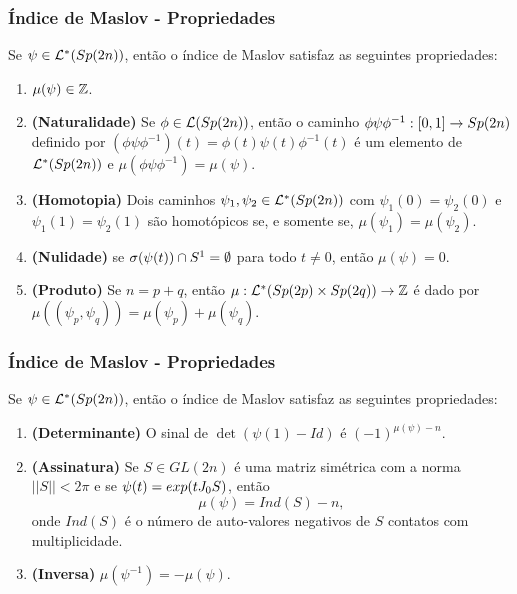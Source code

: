 \documentclass{beamer}
\begin{document}
	\begin{frame}			
		\frametitle{Índice de Maslov - Propriedades}
		\begin{teorema}
			Se $\psi \in \mathcal{L}^{*}(Sp(2n))$, então o índice de Maslov satisfaz as seguintes propriedades:
			\begin{enumerate}
				\item $\mu(\psi) \in \mathbb{Z}$.
				
				\item \textbf{(Naturalidade)}\label{item_naturalidade_maslov} Se $\phi\in \mathcal{L}(Sp(2n))$, então o caminho $\phi\psi\phi^{-1}: [0,1] \to Sp(2n)$ definido por $(\phi\psi\phi^{-1})(t) = \phi(t)\psi(t)\phi^{-1}(t)$ é um elemento de $\mathcal{L}^{*}(Sp(2n))$ e $\mu(\phi\psi\phi^{-1}) = \mu(\psi)$.
				
				\item \textbf{(Homotopia)} \label{item_homotopia_caminhos_teorema_indice_maslov} Dois caminhos $\psi_{1}, \psi_{2}\in \mathcal{L}^{*}(Sp(2n)) $ com $\psi_{1}(0) = \psi_{2}(0)$ e $\psi_{1}(1) = \psi_{2}(1)$ são homotópicos se, e somente se, $\mu(\psi_{1}) = \mu(\psi_{2})$.
				
				\item \textbf{(Nulidade)} se $\sigma(\psi(t))\cap S^{1} = \emptyset$ para todo $t\neq 0$, então $\mu(\psi) = 0$.
				
					\item \textbf{(Produto)} Se $n=p+q$, então  $\mu:\mathcal{L}^{*}(Sp(2p)\times Sp(2q)) \to \mathbb{Z}$ é dado por $\mu((\psi_{p}, \psi_{q})) = \mu(\psi_{p})+\mu(\psi_{q})$.
			\end{enumerate}
		\end{teorema}
	\end{frame}
	
	\begin{frame}
		\frametitle{Índice de Maslov - Propriedades}
			\begin{teorema}\label{teorema_indice_maslov}
				Se $\psi \in \mathcal{L}^{*}(Sp(2n))$, então o índice de Maslov satisfaz as seguintes propriedades:
				\begin{enumerate}
				\item \textbf{(Determinante)} O sinal de $ \det(\psi(1)-Id)$ é $(-1)^{\mu(\psi)-n}$.
					
					\item \textbf{(Assinatura)}\label{item_assinatura_maslov} Se $S \in GL(2n)$ é uma matriz simétrica com a norma $||S|| < 2\pi$ e se $\psi(t) = exp(tJ_{0} S)$, então 
					$$
					\mu(\psi) = Ind(S) - n,
					$$
					onde $Ind(S)$ é o número de auto-valores negativos de $S$ contatos com multiplicidade.
					
					\item \textbf{(Inversa)} $\mu(\psi^{-1}) = -\mu(\psi)$.
					
				\end{enumerate}
			\end{teorema}
	\end{frame}
	
\end{document}
